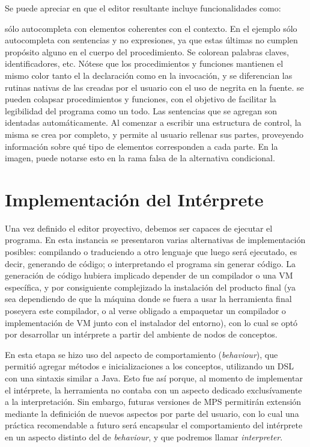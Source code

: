 Se puede apreciar en  que el editor resultante incluye funcionalidades como:
\begin{itemize}
 sólo autocompleta con elementos coherentes con el contexto. En el ejemplo sólo autocompleta con sentencias y no expresiones, ya que estas últimas no cumplen propósito alguno en el cuerpo del procedimiento.
 Se colorean palabras claves, identificadores, etc. Nótese que los procedimientos y funciones mantienen el mismo color tanto el la declaración como en la invocación, y se diferencian las rutinas nativas de las creadas por el usuario con el uso de negrita en la fuente.
 se pueden colapsar procedimientos y funciones, con el objetivo de facilitar la legibilidad del programa como un todo.
 Las sentencias que se agregan son identadas automáticamente.
 Al comenzar a escribir una estructura de control, la misma se crea por completo, y permite al usuario rellenar sus partes, proveyendo información sobre qué tipo de elementos corresponden a cada parte. En la imagen, puede notarse esto en la rama falsa de la alternativa condicional.
\end{itemize}





\section{Implementación del Intérprete}\label{interprete}

Una vez definido el editor proyectivo, debemos ser capaces de ejecutar el programa. En esta instancia se presentaron varias alternativas de implementación posibles: compilando o traduciendo a otro lenguaje que luego será ejecutado, es decir, generando de código; o interpretando el programa sin generar código. La generación de código hubiera implicado depender de un compilador o una VM específica, y por consiguiente complejizado la instalación del producto final (ya sea dependiendo de que la máquina donde se fuera a usar la herramienta final poseyera este compilador, o al verse obligado a empaquetar un compilador o implementación de VM junto con el instalador del entorno), con lo cual se optó por desarrollar un intérprete a partir del ambiente de nodos de conceptos.

En esta etapa se hizo uso del aspecto de comportamiento (\textit{behaviour}), que permitió agregar métodos e inicializaciones a los conceptos, utilizando un DSL con una sintaxis similar a Java. Esto fue así porque, al momento de implementar el intérprete, la herramienta no contaba con un aspecto dedicado exclusívamente a la interpretación. Sin embargo, futuras versiones de MPS permitirán extensión mediante la definición de nuevos aspectos por parte del usuario, con lo cual una práctica recomendable a futuro será encapsular el comportamiento del intérprete en un aspecto distinto del de \textit{behaviour}, y que podremos llamar \textit{interpreter}.

